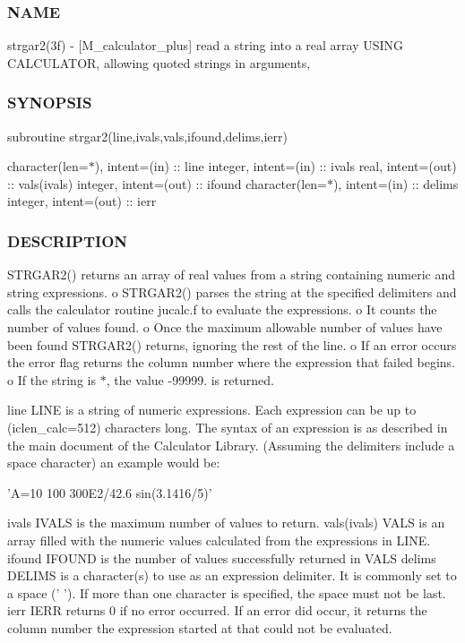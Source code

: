 \subsubsection*{N\+A\+ME}

strgar2(3f) -\/ \mbox{[}M\+\_\+calculator\+\_\+plus\mbox{]} read a string into a real array U\+S\+I\+NG C\+A\+L\+C\+U\+L\+A\+T\+OR, allowing quoted strings in arguments, 

\subsubsection*{S\+Y\+N\+O\+P\+S\+IS}

subroutine strgar2(line,ivals,vals,ifound,delims,ierr)

character(len=$\ast$), intent=(in) \+:\+: line integer, intent=(in) \+:\+: ivals real, intent=(out) \+:\+: vals(ivals) integer, intent=(out) \+:\+: ifound character(len=$\ast$), intent=(in) \+:\+: delims integer, intent=(out) \+:\+: ierr

\subsubsection*{D\+E\+S\+C\+R\+I\+P\+T\+I\+ON}

S\+T\+R\+G\+A\+R2() returns an array of real values from a string containing numeric and string expressions. o S\+T\+R\+G\+A\+R2() parses the string at the specified delimiters and calls the calculator routine jucalc.\+f to evaluate the expressions. o It counts the number of values found. o Once the maximum allowable number of values have been found S\+T\+R\+G\+A\+R2() returns, ignoring the rest of the line. o If an error occurs the error flag returns the column number where the expression that failed begins. o If the string is \textquotesingle{}$\ast$\textquotesingle{}, the value -\/99999. is returned.

line L\+I\+NE is a string of numeric expressions. Each expression can be up to (iclen\+\_\+calc=512) characters long. The syntax of an expression is as described in the main document of the Calculator Library. (Assuming the delimiters include a space character) an example would be\+: \begin{DoxyVerb} 'A=10 100 300E2/42.6  sin(3.1416/5)'
\end{DoxyVerb}
 \begin{DoxyVerb} ivals        IVALS is the maximum number of values to return.
 vals(ivals)  VALS is an array filled with the numeric values calculated from the
              expressions in LINE.
 ifound       IFOUND is the number of values successfully returned in VALS
 delims       DELIMS is a character(s) to use as an expression delimiter. It is
              commonly set to a space (' '). If more than one character is specified,
              the space must not be last.
 ierr         IERR returns 0 if no error occurred. If an error did occur, it returns
              the column number the expression started at that could not be
              evaluated.
\end{DoxyVerb}


